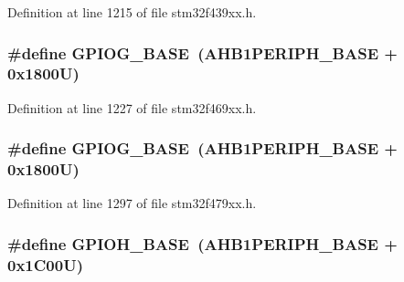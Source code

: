 Definition at line 1215 of file stm32f439xx.\+h.

\subsubsection[{\texorpdfstring{G\+P\+I\+O\+G\+\_\+\+B\+A\+SE}{GPIOG_BASE}}]{\setlength{\rightskip}{0pt plus 5cm}\#define G\+P\+I\+O\+G\+\_\+\+B\+A\+SE~({\bf A\+H\+B1\+P\+E\+R\+I\+P\+H\+\_\+\+B\+A\+SE} + 0x1800\+U)}\hypertarget{group___peripheral__memory__map_ga5d8ca4020f2e8c00bde974e8e7c13cfe}{}\label{group___peripheral__memory__map_ga5d8ca4020f2e8c00bde974e8e7c13cfe}


Definition at line 1227 of file stm32f469xx.\+h.

\subsubsection[{\texorpdfstring{G\+P\+I\+O\+G\+\_\+\+B\+A\+SE}{GPIOG_BASE}}]{\setlength{\rightskip}{0pt plus 5cm}\#define G\+P\+I\+O\+G\+\_\+\+B\+A\+SE~({\bf A\+H\+B1\+P\+E\+R\+I\+P\+H\+\_\+\+B\+A\+SE} + 0x1800\+U)}\hypertarget{group___peripheral__memory__map_ga5d8ca4020f2e8c00bde974e8e7c13cfe}{}\label{group___peripheral__memory__map_ga5d8ca4020f2e8c00bde974e8e7c13cfe}


Definition at line 1297 of file stm32f479xx.\+h.

\subsubsection[{\texorpdfstring{G\+P\+I\+O\+H\+\_\+\+B\+A\+SE}{GPIOH_BASE}}]{\setlength{\rightskip}{0pt plus 5cm}\#define G\+P\+I\+O\+H\+\_\+\+B\+A\+SE~({\bf A\+H\+B1\+P\+E\+R\+I\+P\+H\+\_\+\+B\+A\+SE} + 0x1\+C00\+U)}\hypertarget{group___peripheral__memory__map_gaee4716389f3a1c727495375b76645608}{}\label{group___peripheral__memory__map_gaee4716389f3a1c727495375b76645608}


